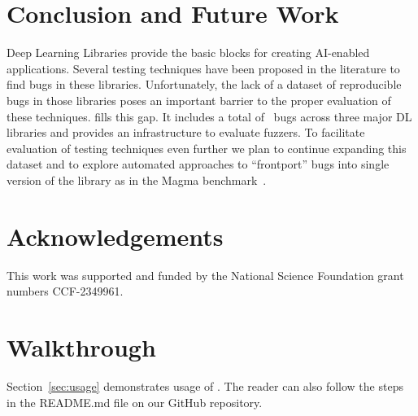 \documentclass[sigconf,screen]{acmart}
\begin{document}
\vspace{-1ex}
\section{Conclusion and Future Work}
Deep Learning Libraries provide the basic blocks for creating
AI-enabled applications. Several testing techniques have been proposed
in the literature to find bugs in these libraries. Unfortunately, the
lack of a dataset of reproducible bugs in those libraries poses an
important barrier to the proper evaluation of these
techniques. \tname{} fills this gap. It includes a total of
\numbugs\ bugs across three major DL libraries and provides an
infrastructure to evaluate fuzzers.  To facilitate evaluation of
testing techniques even further we plan to continue expanding this
dataset and to explore automated approaches to ``frontport'' bugs into
single version of the library as in the Magma
benchmark~\cite{hazimeh2020magma}.


\section*{Acknowledgements}
This work was supported and funded by the National Science Foundation grant numbers CCF-2349961.

\balance



\appendix

\section{Walkthrough}

Section~\ref{sec:usage} demonstrates usage of \tname. The reader can
also follow the steps in the README.md file on our GitHub repository.
\end{document}
